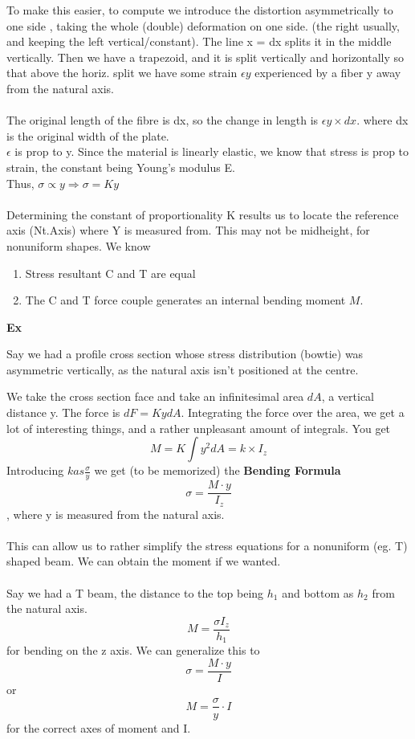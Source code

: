\documentclass[10pt, twocolumn]{report}
\begin{document}
To make this easier, to compute we introduce the distortion asymmetrically to one side , taking the whole (double) deformation on one side. (the right usually, and keeping the left vertical/constant). The line x = dx splits it in the middle vertically. Then we have a trapezoid, and it is split vertically and horizontally so that above the horiz. split we have some strain $\epsilon y$ experienced by a fiber y away from the natural axis.\\\\ The original length of the fibre is dx, so the change in length is $\epsilon y \times dx$. where dx is the original width of the plate. \\ $\epsilon$ is prop to y. Since the material is linearly elastic, we know that stress is prop to strain, the constant being Young's modulus E.\\ Thus, $\sigma \propto y \Rightarrow \sigma = Ky$\\ \\ Determining the constant of proportionality K results us to locate the reference axis (Nt.Axis) where Y is measured from. This may not be midheight, for nonuniform shapes. We know \begin{enumerate}
  \item Stress resultant C and T are equal
  \item The C and T force couple generates an internal bending moment $M$.
\end{enumerate}
\textbf{Ex}

Say we had a profile cross section whose stress distribution (bowtie) was asymmetric vertically, as the natural axis isn't positioned at the centre.

We take the cross section face and take an infinitesimal  area $dA$, a vertical distance y. The force is $dF = KydA$.
Integrating the force over the area, we get a lot of interesting things, and a rather unpleasant amount of integrals. You get $$M= K\int y^2 dA = k \times I_z $$ Introducing $k as \frac{\sigma}{y}$ we get (to be memorized) the \textbf{Bending Formula} $$\sigma = \frac {M\cdot y}{I_z}$$, where y is measured from the natural axis. \\\\

This can allow us to rather simplify the stress equations for a nonuniform (eg. T) shaped beam. We can obtain the moment if we wanted. \\\\ Say we had a T beam, the distance to the top being $h_1$ and bottom as $h_2$ from the natural axis. $$M = \frac {\sigma I_z} {h_1}$$ for bending on the z axis. We can generalize this to $$\sigma = \frac{M\cdot y}{I}$$ or $$M = \frac{\sigma}{y}\cdot I$$ for the correct axes of moment and I.\\
\end{document}
